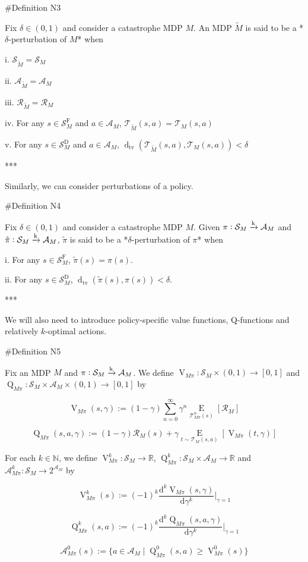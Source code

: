 \documentclass[a4paper]{article}
\newcommand{\AP}[1]{\left(#1\right)}
\newcommand{\AB}[1]{\left[#1\right]}
\newcommand{\Ea}[2]{\underset{#1}{\operatorname{E}}\AB{#2}}
\newcommand{\D}{\mathrm{d}}
\newcommand{\Dtva}[1]{\operatorname{d}_{\text{tv}}\AP{#1}}
\newcommand{\Nats}{\mathbb{N}}
\newcommand{\Reals}{\mathbb{R}}
\newcommand{\M}{\xrightarrow{\textnormal{k}}}
\newcommand{\A}{\mathcal{A}}
\newcommand{\St}{\mathcal{S}}
\newcommand{\T}{\mathcal{T}}
\newcommand{\R}{\mathcal{R}}
\newcommand{\RMD}{\mathrm{D}}
\newcommand{\RMF}{\mathrm{F}}
\newcommand{\SF}{\St^{\RMF}}
\newcommand{\SD}{\St^{\RMD}}
\newcommand{\V}{\operatorname{V}}
\newcommand{\Q}{\operatorname{Q}}
\begin{document}
\#Definition N3

Fix $\delta\in(0,1)$ and consider a catastrophe MDP $M$. An MDP $\tilde{M}$ is said to be a *$\delta$-perturbation of $M$* when

i. $\St_{\tilde{M}} = \St_M$

ii. $\A_{\tilde{M}} = \A_M$

iii. $\R_{\tilde{M}}=\R_M$

iv. For any $s \in \SF_M$ and $a \in \A_M$, $\T_{\tilde{M}}\AP{s,a}=\T_{M}\AP{s,a}$

v. For any $s \in \SD_M$ and $a \in \A_M$, $\Dtva{\T_{\tilde{M}}\AP{s,a},\T_{M}\AP{s,a}} < \delta$

***

Similarly, we can consider perturbations of a policy.

\#Definition N4

Fix $\delta\in(0,1)$ and consider a catastrophe MDP $M$. Given $\pi: \St_M \M \A_M$ and $\tilde{\pi}: \St_M \M \A_M$, $\tilde{\pi}$ is said to be a *$\delta$-perturbation of $\pi$* when

i. For any $s \in \SF_M$, $\tilde{\pi}(s) = \pi(s)$.

ii. For any $s \in \SD_M$, $\Dtva{\tilde{\pi}(s),\pi(s)} < \delta$.

***

We will also need to introduce policy-specific value functions, Q-functions and relatively $k$-optimal actions.

\#Definition N5

Fix an MDP $M$ and $\pi: \St_M \M \A_M$. We define $\V_{M\pi}: \St_M \times (0,1) \rightarrow [0,1]$ and $\Q_{M\pi}: \St_M \times \A_M \times (0,1) \rightarrow [0,1]$ by

$$\V_{M\pi}(s,\gamma) := (1-\gamma) \sum_{n=0}^\infty \gamma^n \Ea{\T_{M\pi}^n(s)}{\R_M}$$

$$\Q_{M\pi}(s,a,\gamma) := (1-\gamma) \R_M(s) + \gamma \Ea{t \sim \T_{M}(s,a)}{\V_{M\pi}(t,\gamma)}$$

For each $k \in \Nats$, we define $\V_{M\pi}^k: \St_M \rightarrow \Reals$, $\Q_{M\pi}^k: \St_M \times \A_M \rightarrow \Reals$ and $\A_{M\pi}^k: \St_M \rightarrow 2^{\A_M}$ by

$$\V_{M\pi}^k(s) := (-1)^k \frac{\D^k \V_{M\pi}(s,\gamma)}{\D\gamma^k}\bigg\vert_{\gamma=1}$$

$$\Q_{M\pi}^k(s,a) := (-1)^k \frac{\D^k \Q_{M\pi}(s,a,\gamma)}{\D\gamma^k}\bigg\vert_{\gamma=1}$$

$$\A_{M\pi}^0(s) := \{a \in \A_M \mid \Q_{M\pi}^0(s,a) \geq \V_{M\pi}^0(s)\}$$
\end{document}
